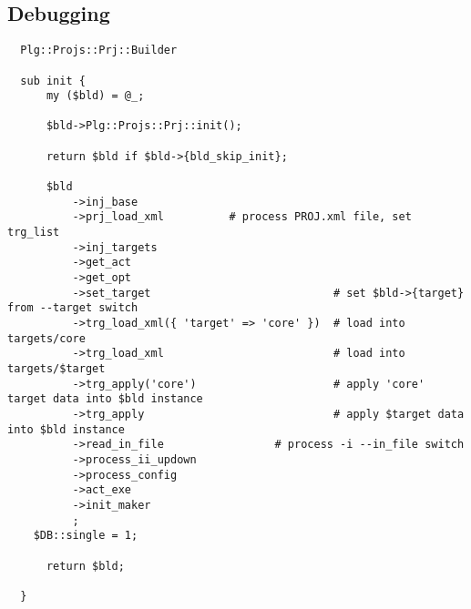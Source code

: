





\subsection{Debugging}
\label{sec:build.dbg}

\begin{Verbatim}
  Plg::Projs::Prj::Builder

  sub init {
      my ($bld) = @_;

      $bld->Plg::Projs::Prj::init();

      return $bld if $bld->{bld_skip_init};

      $bld
          ->inj_base
          ->prj_load_xml          # process PROJ.xml file, set trg_list
          ->inj_targets
          ->get_act
          ->get_opt
          ->set_target                            # set $bld->{target} from --target switch
          ->trg_load_xml({ 'target' => 'core' })  # load into targets/core
          ->trg_load_xml                          # load into targets/$target
          ->trg_apply('core')                     # apply 'core' target data into $bld instance
          ->trg_apply                             # apply $target data into $bld instance
          ->read_in_file                 # process -i --in_file switch
          ->process_ii_updown
          ->process_config
          ->act_exe
          ->init_maker
          ;
    $DB::single = 1;

      return $bld;

  }
\end{Verbatim}


